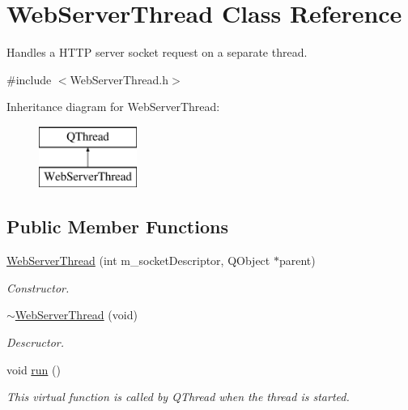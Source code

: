 \hypertarget{class_web_server_thread}{}\section{Web\+Server\+Thread Class Reference}
\label{class_web_server_thread}


Handles a H\+T\+TP server socket request on a separate thread.  




{\ttfamily \#include $<$Web\+Server\+Thread.\+h$>$}

Inheritance diagram for Web\+Server\+Thread\+:\begin{figure}[H]
\begin{center}
\leavevmode
\includegraphics[height=2.000000cm]{class_web_server_thread}
\end{center}
\end{figure}
\subsection*{Public Member Functions}
\begin{DoxyCompactItemize}
\item 
\mbox{\label{class_web_server_thread_a1cecaf23741442bf8d58577098d50fc0}} 
\hyperlink{class_web_server_thread_a1cecaf23741442bf8d58577098d50fc0}{Web\+Server\+Thread} (int m\+\_\+socket\+Descriptor, Q\+Object $\ast$parent)
\begin{DoxyCompactList}\small\item\em Constructor. \end{DoxyCompactList}\item 
\mbox{\label{class_web_server_thread_ad8a6737f8667fdc80edde982415ed14d}} 
\hyperlink{class_web_server_thread_ad8a6737f8667fdc80edde982415ed14d}{$\sim$\+Web\+Server\+Thread} (void)
\begin{DoxyCompactList}\small\item\em Descructor. \end{DoxyCompactList}\item 
\mbox{\label{class_web_server_thread_a301c2ed6e2d0c9a020089862e20b7da6}} 
void \hyperlink{class_web_server_thread_a301c2ed6e2d0c9a020089862e20b7da6}{run} ()
\begin{DoxyCompactList}\small\item\em This virtual function is called by Q\+Thread when the thread is started. \end{DoxyCompactList}\end{DoxyCompactItemize}
